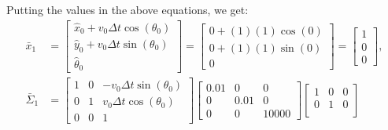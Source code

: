\documentclass[answers]{exam}
\begin{document}
\begin{questions}
\begin{parts}
\begin{solution}
            Putting the values in the above equations, we get:
            \begin{align*}
                \bar{x}_{1}      & = \begin{bmatrix}
                                         \hat{x}_{0} + v_0 \Delta t \cos(\theta_0) \\
                                         \hat{y}_{0} + v_0 \Delta t \sin(\theta_0) \\
                                         \hat{\theta}_{0}
                                     \end{bmatrix}
                = \begin{bmatrix}
                      0 + (1)(1)\cos(0) \\ 0 + (1)(1)\sin(0) \\ 0
                  \end{bmatrix}
                = \begin{bmatrix}
                      1 \\ 0 \\ 0
                  \end{bmatrix},                                                                                                \\
                \bar{\Sigma}_{1} & = \begin{bmatrix}
                                         1 & 0 & -v_0 \Delta t \sin(\theta_0) \\
                                         0 & 1 & v_0 \Delta t \cos(\theta_0)  \\
                                         0 & 0 & 1
                                     \end{bmatrix} \begin{bmatrix}
                                                       0.01 & 0    & 0     \\
                                                       0    & 0.01 & 0     \\
                                                       0    & 0    & 10000
                                                   \end{bmatrix} \begin{bmatrix}
                                                                     1                            & 0                           & 0 \\
                                                                     0                            & 1                           & 0 \\

\end{bmatrix}
\end{align*}
\end{solution}
\end{parts}
\end{questions}
\end{document}
